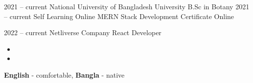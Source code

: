 \documentclass[9pt]{developercv} %
\begin{document}
\vspace{-10 pt}
\begin{entrylist}
    \entry
        {2021 -- current}
		{National University of Bangladesh}
		{University}
		{B.Sc in Botany}
    \entry
        {2021 -- current}
		{Self Learning}
		{Online}
		{MERN Stack Development}
	\entry 
         {}
		{Certificate}
		{Online}
		{\lipsum[1][2]}
\end{entrylist}

\vspace{-10 pt}
\begin{entrylist}
	\entry
        {2022 --  current}
		{Netliverse}
		{Company}
		{React Developer}
        \begin{itemize}[noitemsep,topsep=0pt,parsep=0pt,partopsep=0pt, leftmargin=-1pt]
            \item %
            \item %
        \end{itemize} 
\end{entrylist}

\vspace{-10 pt}
    \vspace{-6pt}
    
    \hspace{26mm} \textbf{English} - comfortable, \textbf{ Bangla} - native

\end{document}
